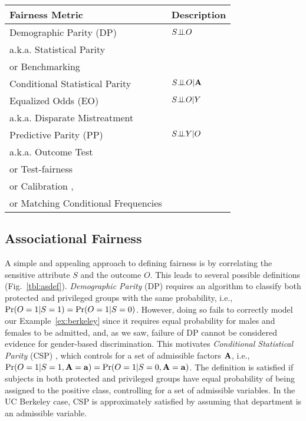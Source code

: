 \documentclass[11pt]{article}
\begin{document}
{\scriptsize
\begin{figure*}  \centering \scriptsize
	\begin{tabular}{|l|l|} \hline
		\textbf{     Fairness Metric}  & \textbf{Description}  \\ \hline
		Demographic Parity (DP) \cite{calders2009building}  & $S \mbox{$\perp\!\!\!\perp$} O$  \\
		a.k.a. Statistical Parity \cite{dwork2012fairness} & \\
		or Benchmarking \cite{simoiu2017problem} & \\ \hline
		Conditional Statistical Parity \cite{corbett2017algorithmic} & $S \mbox{$\perp\!\!\!\perp$} O |{\mathbf{A}}$ \\ \hline
		Equalized Odds (EO) \cite{hardt2016equality} \footnotemark[2] & $S \mbox{$\perp\!\!\!\perp$} O| Y $  \\
		a.k.a.  Disparate Mistreatment  \cite{zafar2017fairness} & \\ \hline
		Predictive Parity (PP)\cite{chouldechova2017fair} \footnotemark[3]  & $S \mbox{$\perp\!\!\!\perp$} Y| O $  \\
		a.k.a. Outcome Test  \cite{simoiu2017problem} & \\
		or Test-fairness  \cite{chouldechova2017fair} & \\
		or Calibration \cite{chouldechova2017fair}, & \\
		or Matching Conditional Frequencies \cite{hardt2016equality} & \\ \hline
	\end{tabular}  
	\caption{      \textmd{ Common associational definitions of fairness.}} \label{tbl:asdef}
\end{figure*}
}
\vspace{-0.3cm}
\subsection{Associational Fairness} A simple and appealing approach to defining fairness is by correlating the sensitive attribute $S$ and the outcome $O$.  This leads to several possible definitions (Fig.~\ref{tbl:asdef}).
\textit{Demographic Parity} (DP)
\cite{dwork2012fairness} requires an algorithm to classify both
protected and privileged groups with the same probability, i.e.,
${\tt \mathrm{Pr}}(O=1|S=1)={\tt \mathrm{Pr}}(O=1|S=0)$.  However, doing so fails to correctly model our Example~\ref{ex:berkeley} since it requires equal probability for males and females to be admitted, and, as we saw, failure of DP cannot be considered evidence for gender-based discrimination.  This motivates  \textit{Conditional Statistical Parity} (CSP)
\cite{corbett2017algorithmic}, which controls for a set of
admissible factors  ${\mathbf{A}}$, i.e.,
${\tt \mathrm{Pr}}(O=1|S=1,{\mathbf{A}}= {\mathbf{a}})={\tt \mathrm{Pr}}(O=1|S=0,{\mathbf{A}}={\mathbf{a}})$. %
The definition is  satisfied  if subjects in both
protected and privileged groups have equal probability of being
 assigned to the positive class, controlling for a set of admissible variables. In the UC Berkeley case, CSP is approximately satisfied by assuming that department is an admissible variable. %
\end{document}
